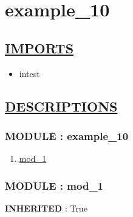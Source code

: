 \chapter*{example\_10}

\section*{\underline{IMPORTS}}
\begin{itemize}
\item intest
\end{itemize}

\section*{\underline{DESCRIPTIONS}}
\subsection*{MODULE : example\_10}
\hypertarget{ecldoc:example_10_example_10}{}
\begin{enumerate}
\item \hyperlink{ecldoc:example_10_intest.Example_3.mod_1}{mod\_1}
\end{enumerate}
\subsection*{MODULE : mod\_1}
\hypertarget{ecldoc:example_10_intest.Example_3.mod_1}{}
\textbf{INHERITED} : True \\

